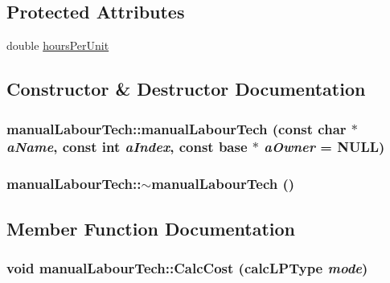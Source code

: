 \subsection*{Protected Attributes}
\begin{DoxyCompactItemize}
\item 
double \hyperlink{classmanual_labour_tech_ac0c48d73dd0631c2623916e49a684b60}{hoursPerUnit}
\end{DoxyCompactItemize}


\subsection{Constructor \& Destructor Documentation}
\hypertarget{classmanual_labour_tech_a67af82062cb5809d5e9ad37de0b1f9f7}{
\subsubsection[{manualLabourTech}]{\setlength{\rightskip}{0pt plus 5cm}manualLabourTech::manualLabourTech (const char $\ast$ {\em aName}, \/  const int {\em aIndex}, \/  const {\bf base} $\ast$ {\em aOwner} = {\ttfamily NULL})}}
\label{classmanual_labour_tech_a67af82062cb5809d5e9ad37de0b1f9f7}
\hypertarget{classmanual_labour_tech_a7d961278e18de8feb427ab9df6734011}{
\subsubsection[{$\sim$manualLabourTech}]{\setlength{\rightskip}{0pt plus 5cm}manualLabourTech::$\sim$manualLabourTech ()}}
\label{classmanual_labour_tech_a7d961278e18de8feb427ab9df6734011}


\subsection{Member Function Documentation}
\hypertarget{classmanual_labour_tech_a672922b49eac69b5ebf765e66bdcb3ef}{
\subsubsection[{CalcCost}]{\setlength{\rightskip}{0pt plus 5cm}void manualLabourTech::CalcCost ({\bf calcLPType} {\em mode})}}
\label{classmanual_labour_tech_a672922b49eac69b5ebf765e66bdcb3ef}


